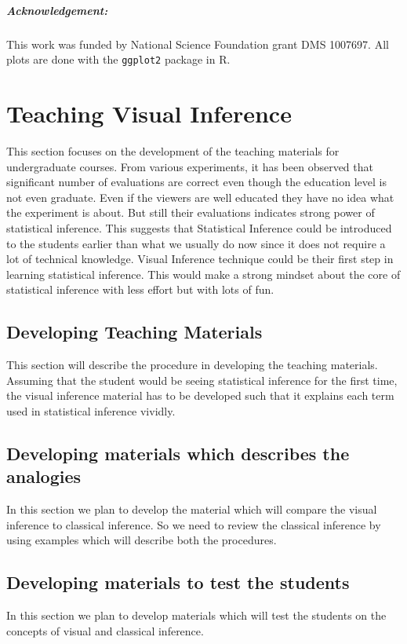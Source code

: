 \documentclass[12]{report}
\begin{document}
\paragraph{Acknowledgement:}

This work was funded by National Science Foundation grant DMS 1007697. All plots are done with the {\tt ggplot2} \citep{hadley:2009} package in R.

%
\chapter{Teaching Visual Inference}\label{ch:teaching} This section focuses on the development of the teaching materials for undergraduate courses. From various experiments, it has been observed that significant number of evaluations are correct even though the education level is not even graduate. Even if the viewers are well educated they have no idea what the experiment is about. But still their evaluations indicates strong power of statistical inference. This suggests that Statistical Inference could be introduced to the students earlier than what we usually do now since it does not require a lot of technical knowledge. Visual Inference technique could be their first step in learning statistical inference. This would make a strong mindset about the core of statistical inference with less effort but with lots of fun.   


\section{Developing Teaching Materials} This section will describe the procedure in developing the teaching materials. Assuming that the student would be seeing statistical inference for the first time, the visual inference material has to be developed such that it explains each term used in statistical inference vividly.

\section{Developing materials which describes the analogies} In this section we plan to develop the material which will compare the visual inference to classical inference. So we need to review the classical inference by using examples which will describe both the procedures.

\section{Developing materials to test the students} In this section we plan to develop materials which will test the students on the concepts of visual and classical inference.
\end{document}
